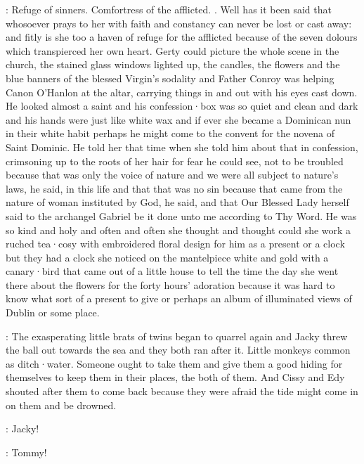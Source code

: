 :
Refuge of sinners.
Comfortress of the afflicted.
.
Well
has it been said that whosoever prays to her with faith and constancy can
never be lost or cast away:
and fitly is she too a haven of refuge for the
afflicted because of the seven dolours which transpierced her own heart.
Gerty could picture the whole scene in the church,
the stained glass
windows lighted up,
the candles,
the flowers and the blue banners of the
blessed Virgin's sodality and Father Conroy was helping Canon O'Hanlon at
the altar,
carrying things in and out with his eyes cast down.
He looked almost a saint
and his confession·box was so quiet and clean and dark and
his hands were just like white wax and if ever she became a Dominican nun
in their white habit perhaps he might come to the convent for the novena
of Saint Dominic.
He told her that time when she told him about that in
confession,
crimsoning up to the roots of her hair for fear he could see,
not to be troubled because that was only the voice of nature and we were
all subject to nature's laws,
he said,
in this life and that that was no
sin because that came from the nature of woman instituted by God,
he said,
and that Our Blessed Lady herself said to the archangel Gabriel be it done
unto me according to Thy Word.
He was so kind and holy and often and often
she thought and thought
could she work a ruched tea·cosy with embroidered
floral design for him as a present or a clock but they had a clock she
noticed on the mantelpiece white and gold with a canary·bird that came out
of a little house to tell the time the day she went there about the
flowers for the forty hours' adoration because it was hard to know what
sort of a present to give or perhaps an album of illuminated views of
Dublin or some place.

:
The exasperating little brats of twins began to quarrel again and Jacky
threw the ball out towards the sea and they both ran after it.
Little monkeys
common as ditch·water.
Someone ought to take them
and give them a good hiding for themselves
to keep them in their places,
the both of them.
And Cissy and Edy shouted after them
to come back
because they were afraid
the tide might come in on them
and be drowned.

\cissy:
Jacky!

\edy:
Tommy!

